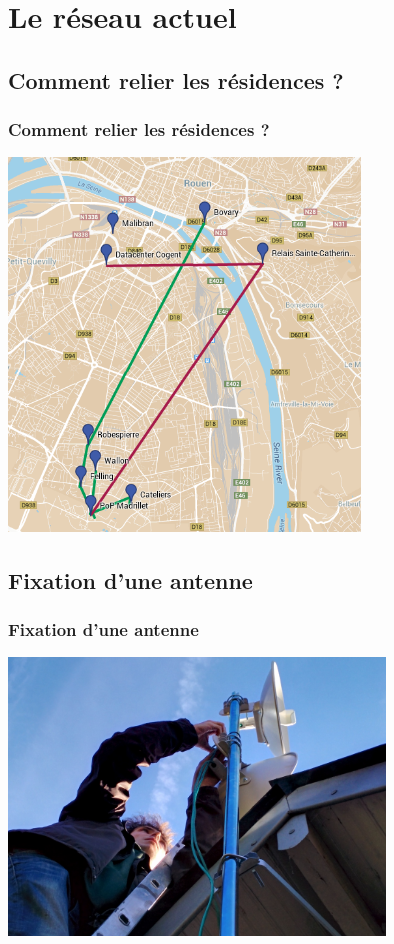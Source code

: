 \documentclass[handout]{beamer}
\begin{document}
	\section{Le réseau actuel}

	\subsection{Comment relier les résidences ?}
		\begin{frame}
		\frametitle{Comment relier les résidences ?}
		\vspace{-5px}
		\begin{center}
			\includegraphics[width=0.70\textwidth]{images/futurReseau.png}
		\end{center}
		
		\end{frame}

	\subsection{Fixation d'une antenne}
		\begin{frame}
		\frametitle{Fixation d'une antenne}
		\vspace{-5px}
		\begin{center}
			\includegraphics[width=0.75\textwidth]{images/jossAntenne.jpg}
		\end{center}
		
		\end{frame}
\end{document}
